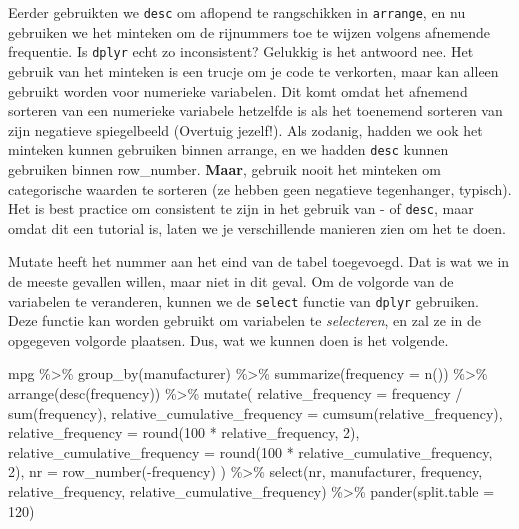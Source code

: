 \documentclass[]{tufte-book}
\newenvironment{Shaded}{}{}
\newcommand{\AttributeTok}[1]{\textcolor[rgb]{0.49,0.56,0.16}{#1}}
\newcommand{\DecValTok}[1]{\textcolor[rgb]{0.25,0.63,0.44}{#1}}
\newcommand{\FunctionTok}[1]{\textcolor[rgb]{0.02,0.16,0.49}{#1}}
\newcommand{\NormalTok}[1]{#1}
\newcommand{\SpecialCharTok}[1]{\textcolor[rgb]{0.25,0.44,0.63}{#1}}
\begin{document}
Eerder gebruikten we \texttt{desc} om aflopend te rangschikken in \texttt{arrange}, en nu gebruiken we het minteken om de rijnummers toe te wijzen volgens afnemende frequentie. Is \texttt{dplyr} echt zo inconsistent? Gelukkig is het antwoord nee. Het gebruik van het minteken is een trucje om je code te verkorten, maar kan alleen gebruikt worden voor numerieke variabelen. Dit komt omdat het afnemend sorteren van een numerieke variabele hetzelfde is als het toenemend sorteren van zijn negatieve spiegelbeeld (Overtuig jezelf!). Als zodanig, hadden we ook het minteken kunnen gebruiken binnen arrange, en we hadden \texttt{desc} kunnen gebruiken binnen row\_number. \textbf{Maar}, gebruik nooit het minteken om categorische waarden te sorteren (ze hebben geen negatieve tegenhanger, typisch). Het is best practice om consistent te zijn in het gebruik van - of \texttt{desc}, maar omdat dit een tutorial is, laten we je verschillende manieren zien om het te doen.

Mutate heeft het nummer aan het eind van de tabel toegevoegd. Dat is wat we in de meeste gevallen willen, maar niet in dit geval. Om de volgorde van de variabelen te veranderen, kunnen we de \texttt{select} functie van \texttt{dplyr} gebruiken. Deze functie kan worden gebruikt om variabelen te \emph{selecteren}, en zal ze in de opgegeven volgorde plaatsen. Dus, wat we kunnen doen is het volgende.

\begin{Shaded}
\begin{Highlighting}[]
\NormalTok{mpg }\SpecialCharTok{\%\textgreater{}\%}
  \FunctionTok{group\_by}\NormalTok{(manufacturer) }\SpecialCharTok{\%\textgreater{}\%}
  \FunctionTok{summarize}\NormalTok{(}\AttributeTok{frequency =} \FunctionTok{n}\NormalTok{()) }\SpecialCharTok{\%\textgreater{}\%}
  \FunctionTok{arrange}\NormalTok{(}\FunctionTok{desc}\NormalTok{(frequency)) }\SpecialCharTok{\%\textgreater{}\%}
  \FunctionTok{mutate}\NormalTok{(}
    \AttributeTok{relative\_frequency =}\NormalTok{ frequency }\SpecialCharTok{/} \FunctionTok{sum}\NormalTok{(frequency),}
    \AttributeTok{relative\_cumulative\_frequency =} \FunctionTok{cumsum}\NormalTok{(relative\_frequency),}
    \AttributeTok{relative\_frequency =} \FunctionTok{round}\NormalTok{(}\DecValTok{100} \SpecialCharTok{*}\NormalTok{ relative\_frequency, }\DecValTok{2}\NormalTok{),}
    \AttributeTok{relative\_cumulative\_frequency =} \FunctionTok{round}\NormalTok{(}\DecValTok{100} \SpecialCharTok{*}\NormalTok{ relative\_cumulative\_frequency, }\DecValTok{2}\NormalTok{),}
    \AttributeTok{nr =} \FunctionTok{row\_number}\NormalTok{(}\SpecialCharTok{{-}}\NormalTok{frequency)}
\NormalTok{  ) }\SpecialCharTok{\%\textgreater{}\%}
  \FunctionTok{select}\NormalTok{(nr, manufacturer, frequency, relative\_frequency, relative\_cumulative\_frequency) }\SpecialCharTok{\%\textgreater{}\%}
  \FunctionTok{pander}\NormalTok{(}\AttributeTok{split.table =} \DecValTok{120}\NormalTok{)}
\end{Highlighting}
\end{Shaded}
\end{document}
